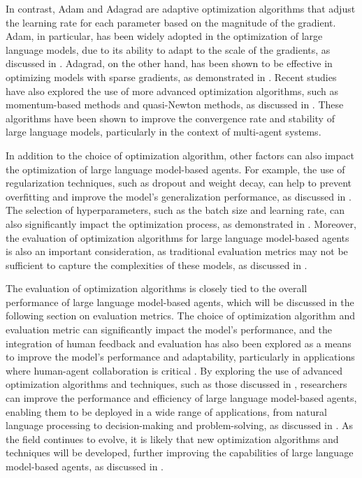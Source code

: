 \documentclass[11pt,a4paper]{article}
\begin{document}
In contrast, Adam and Adagrad are adaptive optimization algorithms that adjust the learning rate for each parameter based on the magnitude of the gradient. Adam, in particular, has been widely adopted in the optimization of large language models, due to its ability to adapt to the scale of the gradients, as discussed in \cite{arxiv:2311.13884}. Adagrad, on the other hand, has been shown to be effective in optimizing models with sparse gradients, as demonstrated in \cite{arxiv:2311.06622}. Recent studies have also explored the use of more advanced optimization algorithms, such as momentum-based methods and quasi-Newton methods, as discussed in \cite{arxiv:2406.04151}. These algorithms have been shown to improve the convergence rate and stability of large language models, particularly in the context of multi-agent systems.

In addition to the choice of optimization algorithm, other factors can also impact the optimization of large language model-based agents. For example, the use of regularization techniques, such as dropout and weight decay, can help to prevent overfitting and improve the model's generalization performance, as discussed in \cite{doi:10.1609/aaaiss.v2i1.27688}. The selection of hyperparameters, such as the batch size and learning rate, can also significantly impact the optimization process, as demonstrated in \cite{arxiv:2401.06201}. Moreover, the evaluation of optimization algorithms for large language model-based agents is also an important consideration, as traditional evaluation metrics may not be sufficient to capture the complexities of these models, as discussed in \cite{arxiv:2412.14470}.

The evaluation of optimization algorithms is closely tied to the overall performance of large language model-based agents, which will be discussed in the following section on evaluation metrics. The choice of optimization algorithm and evaluation metric can significantly impact the model's performance, and the integration of human feedback and evaluation has also been explored as a means to improve the model's performance and adaptability, particularly in applications where human-agent collaboration is critical \cite{arxiv:2402.12914}. By exploring the use of advanced optimization algorithms and techniques, such as those discussed in \cite{arxiv:2410.06153}, researchers can improve the performance and efficiency of large language model-based agents, enabling them to be deployed in a wide range of applications, from natural language processing to decision-making and problem-solving, as discussed in \cite{doi:10.1145/3748302}. As the field continues to evolve, it is likely that new optimization algorithms and techniques will be developed, further improving the capabilities of large language model-based agents, as discussed in \cite{arxiv:2401.10910}.
\end{document}
